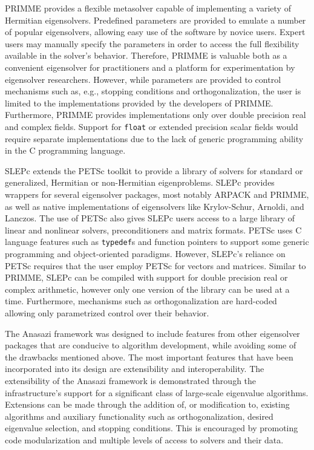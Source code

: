 \documentclass[acmtoms]{acmtrans2m}
\newcounter{algorithm}
\begin{document}
PRIMME provides a flexible metasolver capable of implementing a variety of
Hermitian eigensolvers. Predefined parameters are provided to emulate a number of 
popular eigensolvers, allowing easy use of the software by novice users. Expert users may
manually specify the parameters in order to access the full flexibility available in the
solver's behavior. Therefore, PRIMME is valuable both as a convenient eigensolver for
practitioners and a platform for experimentation by eigensolver researchers. However,
while parameters are provided to control mechanisms such as, e.g., stopping conditions and
orthogonalization, the user is limited to the implementations provided by the developers of
PRIMME.  Furthermore, PRIMME provides implementations only over double precision real and complex
fields.  Support for \texttt{float} or extended precision scalar fields would require separate
implementations due to the lack of generic programming ability in the C programming
language.

SLEPc extends the PETSc toolkit to provide a library of solvers for standard or
generalized, Hermitian or non-Hermitian eigenproblems.
SLEPc provides wrappers for several eigensolver packages, most notably ARPACK and PRIMME,
as well as native implementations of eigensolvers like Krylov-Schur, Arnoldi, and Lanczos.
The use of PETSc also gives SLEPc users access to a large library of linear and nonlinear 
solvers, preconditioners and matrix formats. PETSc uses C language features such as 
\texttt{typedef}s and function pointers to support some generic programming and object-oriented 
paradigms. However, SLEPc's reliance on PETSc requires that the user employ PETSc for vectors 
and matrices. Similar to PRIMME, SLEPc can be compiled with support for double precision
real or complex arithmetic, however only one version of the library can be used at a time.
Furthermore, mechanisms such as orthogonalization are hard-coded allowing only parametrized 
control over their behavior. 

The Anasazi framework was designed to include features from other eigensolver packages
that are conducive to algorithm development, while avoiding some of the drawbacks
mentioned above.  The most important features that have been incorporated into its design
are extensibility and interoperability.  The extensibility of the Anasazi framework is
demonstrated through the infrastructure's support for a significant class of large-scale
eigenvalue algorithms.  Extensions can be made through the addition of, or modification
to, existing algorithms and auxiliary functionality such as orthogonalization, desired
eigenvalue selection, and stopping conditions.  This is encouraged by promoting code
modularization and multiple levels of access to solvers and their data. 
\end{document}
